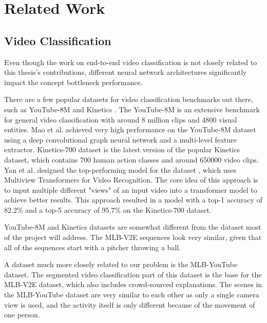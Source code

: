 \chapter{Related Work}

\section{Video Classification}
\label{video-classification}

Even though the work on end-to-end video classification is not closely related to this thesis's contributions, different neural network architectures significantly impact the concept bottleneck performance.

There are a few popular datasets for video classification benchmarks out there, such as YouTube-8M \cite{RefWorks:RefID:10-abu-el-haija2016youtube-8m:} and Kinetics \cite{RefWorks:RefID:9-carreira2017quo}.
The YouTube-8M \cite{RefWorks:RefID:10-abu-el-haija2016youtube-8m:} is an extensive benchmark for general video classification with around 8 million clips and 4800 visual entities.
Mao et al. \cite{RefWorks:RefID:4-mao2019hierarchical} achieved very high performance on the YouTube-8M dataset using a deep convolutional graph neural network and a multi-level feature extractor.
Kinetics-700 \cite{RefWorks:RefID:14-carreira2019short} dataset is the latest version of the popular Kinetics dataset, which contains 700 human action classes and around 650000 video clips.
Yan et al. designed the top-performing model for the dataset \cite{RefWorks:RefID:8-yan2022multiview}, which uses Multiview Transformers for Video Recognition. 
The core idea of this approach is to input multiple different "views" of an input video into a transformer model to achieve better results.
This approach resulted in a model with a top-1 accuracy of 82.2\% and a top-5 accuracy of 95.7\% on the Kinetics-700 dataset.

YouTube-8M and Kinetics datasets are somewhat different from the dataset most of the project will address.
The MLB-V2E sequences look very similar, given that all of the sequences start with a pitcher throwing a ball.

A dataset much more closely related to our problem is the MLB-YouTube \cite{RefWorks:RefID:3-piergiovanni2018fine-grained} dataset.
The segmented video classification part of this dataset is the base for the MLB-V2E \cite{RefWorks:RefID:16-2021automatic} dataset, which also includes crowd-sourced explanations. 
The scenes in the MLB-YouTube dataset are very similar to each other as only a single camera view is used, and the activity itself is only different because of the movement of one person.

